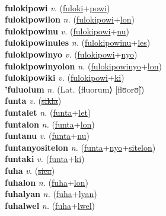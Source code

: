  \label{fulokiles} \\
\textbf{fulokipowi} \textit{v.} (\hyperref[fuloki]{fuloki}+\hyperref[powi]{powi})
 \label{fulokipowi} \\
\textbf{fulokipowilon} \textit{n.} (\hyperref[fulokipowi]{fulokipowi}+\hyperref[lon]{lon})
 \label{fulokipowilon} \\
\textbf{fulokipowinu} \textit{v.} (\hyperref[fulokipowi]{fulokipowi}+\hyperref[nu]{nu})
 \label{fulokipowinu} \\
\textbf{fulokipowinules} \textit{n.} (\hyperref[fulokipowinu]{fulokipowinu}+\hyperref[les]{les})
 \label{fulokipowinules} \\
\textbf{fulokipowinyo} \textit{v.} (\hyperref[fulokipowi]{fulokipowi}+\hyperref[nyo]{nyo})
 \label{fulokipowinyo} \\
\textbf{fulokipowinyolon} \textit{n.} (\hyperref[fulokipowinyo]{fulokipowinyo}+\hyperref[lon]{lon})
 \label{fulokipowinyolon} \\
\textbf{fulokipowiki} \textit{v.} (\hyperref[fulokipowi]{fulokipowi}+\hyperref[ki]{ki})
 \label{fulokipowiki} \\
\textbf{'fuluolum} \textit{n.} (Lat. ⟨fluorum⟩ [flʊorʊ̃])
 \label{'fuluolum} \\
\textbf{funta} \textit{v.} (\hyperref[sikla]{\sout{sikla}})
 \label{funta} \\
\textbf{funtalet} \textit{n.} (\hyperref[funta]{funta}+\hyperref[let]{let})
 \label{funtalet} \\
\textbf{funtalon} \textit{n.} (\hyperref[funta]{funta}+\hyperref[lon]{lon})
 \label{funtalon} \\
\textbf{funtanu} \textit{v.} (\hyperref[funta]{funta}+\hyperref[nu]{nu})
 \label{funtanu} \\
\textbf{funtanyositelon} \textit{n.} (\hyperref[funta]{funta}+\hyperref[nyo]{nyo}+\hyperref[sitelon]{sitelon})
 \label{funtanyositelon} \\
\textbf{funtaki} \textit{v.} (\hyperref[funta]{funta}+\hyperref[ki]{ki})
 \label{funtaki} \\
\textbf{fuha} \textit{v.} (\hyperref[sica]{\sout{sica}})
 \label{fuha} \\
\textbf{fuhalon} \textit{n.} (\hyperref[fuha]{fuha}+\hyperref[lon]{lon})
 \label{fuhalon} \\
\textbf{fuhalyan} \textit{n.} (\hyperref[fuha]{fuha}+\hyperref[lyan]{lyan})
 \label{fuhalyan} \\
\textbf{fuhalwel} \textit{n.} (\hyperref[fuha]{fuha}+\hyperref[lwel]{lwel})
 \label{fuhalwel} \\
